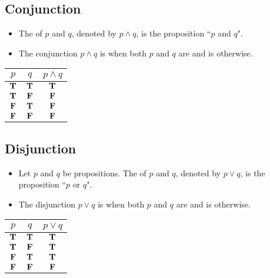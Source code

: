   \subsection{Conjunction}
      \begin{itemize}
        \item The  of $p$ and $q$, denoted by $p \land q$, is the proposition ``$p$ and $q$".
        \item The conjunction $p \land q$ is  when both $p$ and $q$ are 
        and is  otherwise.
      \end{itemize}

      \begin{center}
        \begin{tabular}{|c|c|c|}
          \hline
          $p$ & $q$ & $p \land q$ \\
          \hline
          $\mathbf{T}$ & $\mathbf{T}$ & $\mathbf{T}$ \\
          \hline
          $\mathbf{T}$ & $\mathbf{F}$ & $\mathbf{F}$ \\
          \hline
          $\mathbf{F}$ & $\mathbf{T}$ & $\mathbf{F}$ \\
          \hline
          $\mathbf{F}$ & $\mathbf{F}$ & $\mathbf{F}$ \\
          \hline
        \end{tabular}
      \end{center}

  \subsection{Disjunction}
      \begin{itemize}
        \item Let $p$ and $q$ be propositions. The 
        of $p$ and $q$, denoted by $p \lor q$, is the proposition ``$p$ or $q$".
        \item The disjunction $p \lor q$ is  when both $p$ and $q$ are  and is  otherwise.
      \end{itemize}

      \begin{center}
        \begin{tabular}{|c|c|c|}
          \hline
          $p$ & $q$ & $p \lor q$ \\
          \hline
          $\mathbf{T}$ & $\mathbf{T}$ & $\mathbf{T}$ \\
          \hline
          $\mathbf{T}$ & $\mathbf{F}$ & $\mathbf{T}$ \\
          \hline
          $\mathbf{F}$ & $\mathbf{T}$ & $\mathbf{T}$ \\
          \hline
          $\mathbf{F}$ & $\mathbf{F}$ & $\mathbf{F}$ \\
          \hline
        \end{tabular}
      \end{center}

